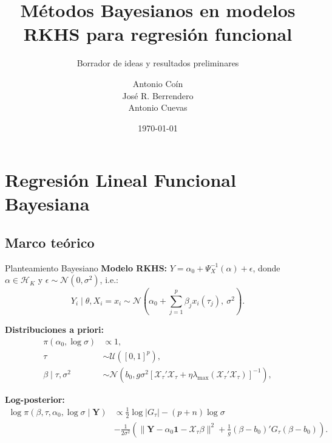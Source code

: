 \documentclass[10pt, spanish, professionalfonts]{beamer}
\title{Métodos Bayesianos en modelos RKHS para regresión funcional}
\subtitle{Borrador de ideas y resultados preliminares}
\date{\today \\}
\author{Antonio Coín \\ José R. Berrendero \\ Antonio Cuevas\\}
\institute{Universidad Autónoma de Madrid \\ \textit{Departamento de Matemáticas}}
\begin{document}
\maketitle

\section{Regresión Lineal Funcional Bayesiana}

\subsection{Marco teórico}

\begin{frame}{Planteamiento Bayesiano}
  \textbf{Modelo RKHS:} \(Y = \alpha_0 + \Psi_{X}^{-1}(\alpha) + \epsilon\), donde \(\alpha\in \mathcal H_K\) y \(\epsilon \sim \mathcal N(0, \sigma^2)\), i.e.:
  \[
    Y_i\mid \theta, X_i=x_i \sim \mathcal N\left(\alpha_0 + \sum_{j=1}^p \beta_jx_i(\tau_j), \ \sigma^2\right).
  \]

\textbf{Distribuciones a priori:}
\begin{align*}
  \pi(\alpha_0, \log \sigma)              & \propto 1,                                                     \\
  \tau                     & \sim \mathcal U([0, 1]^p),                                              \\
  \beta\mid \tau, \sigma^2 & \sim \mathcal N\left(b_0, g\sigma^2\left[\mathcal X_\tau' \mathcal X_\tau + \eta \lambda_{\text{max}}(\mathcal X_\tau' \mathcal X_\tau)\right]^{-1}\right),
\end{align*}

\textbf{Log-posterior:}
\begin{align*}
  \log \pi(\beta, \tau, \alpha_0, \log\sigma\mid \boldsymbol{Y}) &\propto \frac{1}{2}\log |G_\tau| - (p+n)\log \sigma\\
  &-\frac{1}{2\sigma^2} \left(\|\boldsymbol{Y}-\alpha_0\boldsymbol{1} - \mathcal X_\tau\beta\|^2 + \frac{1}{g}(\beta - b_0)'G_\tau(\beta - b_0) \right).
\end{align*}
\end{frame}
\end{document}

